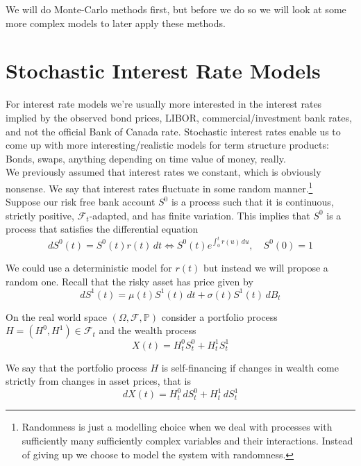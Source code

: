\documentclass[12pt]{article}
\newlength\tindent
\renewcommand{\indent}{\hspace*{\tindent}}
\begin{document}
\indent We will do Monte-Carlo methods first, but before we do so we will look at some more complex models to later apply these methods.

\section{Stochastic Interest Rate Models}

\indent For interest rate models we're usually more interested in the interest rates implied by the observed bond prices, LIBOR, commercial/investment bank rates, and not the official Bank of Canada rate. Stochastic interest rates enable us to come up with more interesting/realistic models for term structure products: Bonds, swaps, anything depending on time value of money, really. \\

\indent We previously assumed that interest rates we constant, which is obviously nonsense. We say that interest rates fluctuate in some random manner.\footnote{Randomness is just a modelling choice when we deal with processes with sufficiently many sufficiently complex variables and their interactions. Instead of giving up we choose to model the system with randomness.}\\

\indent Suppose our risk free bank account $S^0$ is a process such that it is continuous, strictly positive, $\mathcal F_t$-adapted, and has finite variation. This implies that $S^0$ is a process that satisfies the differential equation
\begin{equation*}
	dS^0(t) = S^0(t)r(t)\,dt \iff S^0(t)e^{\int^t_0 r(u)\,du}, \quad S^0(0) = 1
\end{equation*}

\indent We could use a deterministic model for $r(t)$ but instead we will propose a random one. Recall that the risky asset has price given by
\begin{equation*}
	dS^1(t) = \mu(t)S^1(t)\,dt + \sigma(t)S^1(t)\,dB_t
\end{equation*}

\indent On the real world space $(\Omega,\mathcal F,\mathbb P)$ consider a portfolio process $H = (H^0,H^1)\in\mathcal F_t$ and the wealth process
\begin{equation*}
	X(t) = H^0_tS^0_t + H^1_tS^1_t
\end{equation*}

\indent We say that the portfolio process $H$ is self-financing if changes in wealth come strictly from changes in asset prices, that is
\begin{equation*}
	dX(t) = H^0_t\,dS^0_t + H^1_t\,dS^1_t
\end{equation*}
\end{document}
